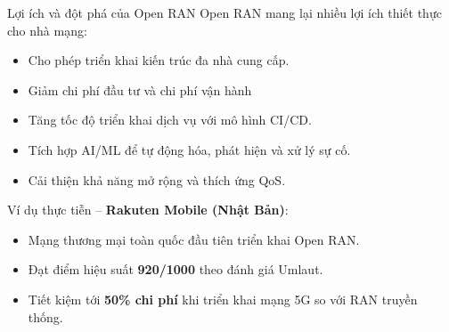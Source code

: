 \begin{frame}{Lợi ích và đột phá của Open RAN}
  Open RAN mang lại nhiều lợi ích thiết thực cho nhà mạng:
  \begin{itemize}
    \item Cho phép triển khai kiến trúc đa nhà cung cấp.
    \item Giảm chi phí đầu tư và chi phí vận hành
    \item Tăng tốc độ triển khai dịch vụ với mô hình CI/CD.
    \item Tích hợp AI/ML để tự động hóa, phát hiện và xử lý sự cố.
    \item Cải thiện khả năng mở rộng và thích ứng QoS.
  \end{itemize}

  \vspace{0.3cm}
  Ví dụ thực tiễn -- \textbf{Rakuten Mobile (Nhật Bản)}:
  \begin{itemize}
    \item Mạng thương mại toàn quốc đầu tiên triển khai Open RAN.
    \item Đạt điểm hiệu suất \textbf{920/1000} theo đánh giá Umlaut.
    \item Tiết kiệm tới \textbf{50\% chi phí} khi triển khai mạng 5G so với RAN truyền thống.
  \end{itemize}
\end{frame}
